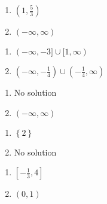 \begin{multicols}{2}
\begin{enumerate}
\setcounter{enumi}{\value{HW}}

\item  $\left( 1, \frac{5}{3} \right)$

\item   $(-\infty, \infty)$

\setcounter{HW}{\value{enumi}}
\end{enumerate}
\end{multicols}

\begin{multicols}{2}
\begin{enumerate}
\setcounter{enumi}{\value{HW}}

\item $(-\infty, -3] \cup [1, \infty)$

\item  $\left(-\infty, -\frac{1}{4}\right) \cup \left(-\frac{1}{4}, \infty \right)$

\setcounter{HW}{\value{enumi}}
\end{enumerate}
\end{multicols}

\begin{multicols}{2}
\begin{enumerate}
\setcounter{enumi}{\value{HW}}

\item  No solution
\item  $(-\infty, \infty)$


\setcounter{HW}{\value{enumi}}
\end{enumerate}
\end{multicols}

\begin{multicols}{2}
\begin{enumerate}
\setcounter{enumi}{\value{HW}}

\item  $\left\{2 \right\}$
\item No solution


\setcounter{HW}{\value{enumi}}
\end{enumerate}
\end{multicols}

\begin{multicols}{2}
\begin{enumerate}
\setcounter{enumi}{\value{HW}}

\item $\left[-\frac{1}{3}, 4 \right]$
\item $(0, 1)$

\setcounter{HW}{\value{enumi}}
\end{enumerate}
\end{multicols}

